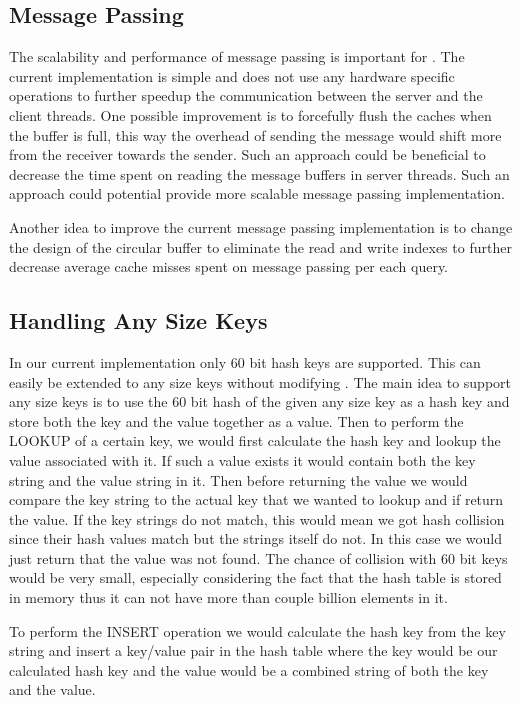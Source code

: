 \subsection{Message Passing}

The scalability and performance of message passing is important for \cphash{}. The current implementation is simple and does not use
any hardware specific operations to further speedup the communication between the server and the client threads. One possible improvement is to
forcefully flush the caches when the buffer is full, this way the overhead of sending the message would shift more from the receiver towards the sender. 
Such an approach could be beneficial to decrease the time spent on reading the message buffers in server threads. Such an approach could potential provide
more scalable message passing implementation. 

Another idea to improve the current message passing implementation is to change the design of the circular buffer to eliminate the read and write indexes
to further decrease average cache misses spent on message passing per each query. 



\subsection{Handling Any Size Keys}
\label{sec:anykey}

In our current implementation only 60 bit hash keys are supported. This can easily be extended to any size keys
without modifying \cpserver{}. The main idea to support any size keys is to use the 60 bit hash of the given any size key as a hash key and store both the 
key and the value together as a value. Then to perform the LOOKUP of a certain key, we would first calculate the hash key
and lookup the value associated with it. If such a value exists it would contain both the key string and the value string in
it. Then before returning the value we would compare the key string to the actual key that we wanted to lookup and if
return the value. If the key strings do not match, this would mean we got hash collision since their hash values match but the 
strings itself do not. In this case we would just return that the value was not found. The chance of collision with 60 bit keys 
would be very small, especially considering the fact that the hash table is stored in memory thus it can not have more than 
couple billion elements in it.

To perform the INSERT operation we would calculate the hash key from the key string and insert a key/value pair in the hash table
where the key would be our calculated hash key and the value would be a combined string of both the key and the value.

